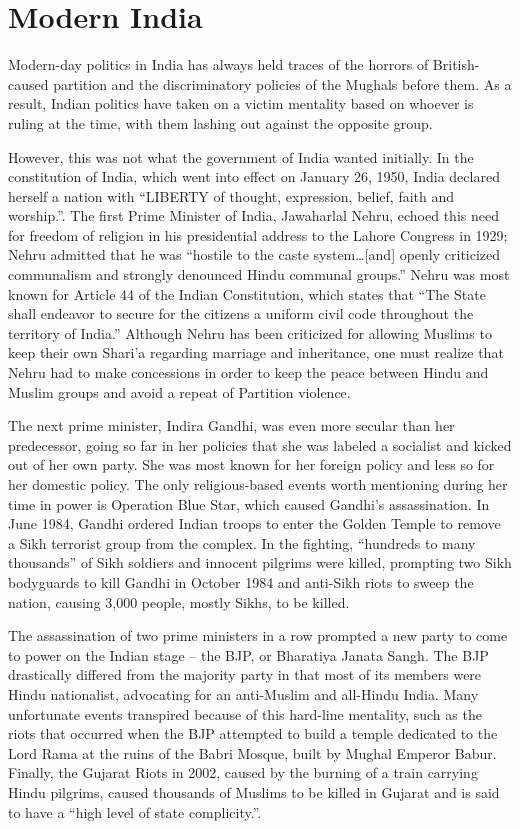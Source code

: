 \documentclass[11pt, letterpaper]{article}
\begin{document}
\section{Modern India}\label{modern-india}

Modern-day politics in India has always held traces of the horrors of
British-caused partition and the discriminatory policies of the Mughals
before them. As a result, Indian politics have taken on a victim
mentality based on whoever is ruling at the time, with them lashing out
against the opposite group.

However, this was not what the government of India wanted initially. In
the constitution of India, which went into effect on January 26, 1950,
India declared herself a nation with ``LIBERTY of thought, expression,
belief, faith and worship.''. The first Prime Minister of India,
Jawaharlal Nehru, echoed this need for freedom of religion in his
presidential address to the Lahore Congress in 1929; Nehru admitted that
he was ``hostile to the caste system\ldots{[}and{]} openly criticized
communalism and strongly denounced Hindu communal groups.'' \cite{oxford}  Nehru was most known for Article 44 of the Indian
Constitution, which states that ``The State shall endeavor to secure for
the citizens a uniform civil code throughout the territory of India.'' \cite{oxford} 
Although Nehru has been criticized for allowing Muslims to keep their
own Shari'a regarding marriage and inheritance, one must realize that
Nehru had to make concessions in order to keep the peace between Hindu
and Muslim groups and avoid a repeat of Partition violence.

The next prime minister, Indira Gandhi, was even more secular than her
predecessor, going so far in her policies that she was labeled a
socialist and kicked out of her own party. She was most known for her
foreign policy and less so for her domestic policy. The only
religious-based events worth mentioning during her time in power is
Operation Blue Star, which caused Gandhi's assassination. In June 1984,
Gandhi ordered Indian troops to enter the Golden Temple to remove a Sikh
terrorist group from the complex. In the fighting, ``hundreds to many
thousands'' \cite{hamlyn} of Sikh soldiers and innocent pilgrims were killed,
prompting two Sikh bodyguards to kill Gandhi in October 1984 and
anti-Sikh riots to sweep the nation, causing 3,000 people, mostly Sikhs,
to be killed.

The assassination of two prime ministers in a row prompted a new party
to come to power on the Indian stage -- the BJP, or Bharatiya Janata
Sangh. The BJP drastically differed from the majority party in that most
of its members were Hindu nationalist, advocating for an anti-Muslim and
all-Hindu India. Many unfortunate events transpired because of this
hard-line mentality, such as the riots that occurred when the BJP
attempted to build a temple dedicated to the Lord Rama at the ruins of
the Babri Mosque, built by Mughal Emperor Babur. Finally, the Gujarat
Riots in 2002, caused by the burning of a train carrying Hindu pilgrims,
caused thousands of Muslims to be killed in Gujarat and is said to have
a ``high level of state complicity.''.
\end{document}

